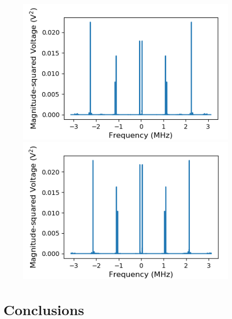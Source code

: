 \documentclass[a4paper]{article}
\begin{document}
\begin{figure}
\centering
\begin{minipage}{.5\textwidth}
	\centering
	\includegraphics[width=.9\linewidth]{7-3/php}
	\caption{}
	\label{fig:php}
\end{minipage}%
\begin{minipage}{.5\textwidth}
	\centering
	\includegraphics[width=.9\linewidth]{7-3/plp}
	\caption{}
	\label{fig:plp}
\end{minipage}
\end{figure}

\section{Conclusions}



\end{document}
